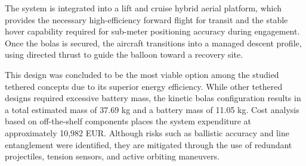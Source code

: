 The system is integrated into a lift and cruise hybrid aerial platform, which provides the necessary high-efficiency forward flight for transit and the stable hover capability required for sub-meter positioning accuracy during engagement. Once the bolas is secured, the aircraft transitions into a managed descent profile, using directed thrust to guide the balloon toward a recovery site.

This design was concluded to be the most viable option among the studied tethered concepts due to its superior energy efficiency. While other tethered designs required excessive battery mass, the kinetic bolas configuration results in a total estimated mass of 37.69 kg and a battery mass of 11.05 kg. Cost analysis based on off-the-shelf components places the system expenditure at approximately 10,982 EUR. Although risks such as ballistic accuracy and line entanglement were identified, they are mitigated through the use of redundant projectiles, tension sensors, and active orbiting maneuvers.